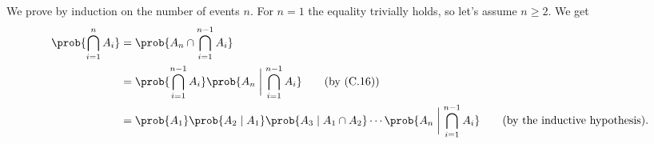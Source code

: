 We prove by induction on the number of events $n$.
For $n=1$ the equality trivially holds, so let's assume $n\ge2$.
We get
\begin{align*}
    \prob{\bigcap_{i=1}^nA_i} &= \prob{A_n\cap\bigcap_{i=1}^{n-1}A_i} \\
    &= \prob{\bigcap_{i=1}^{n-1}A_i}\prob{A_n\biggm|\bigcap_{i=1}^{n-1}A_i} \tag{by (C.16)} \\
    &= \prob{A_1}\prob{A_2\mid A_1}\prob{A_3\mid A_1\cap A_2}\cdots\prob{A_n\biggm|\bigcap_{i=1}^{n-1}A_i} \tag{by the inductive hypothesis}.
\end{align*}
